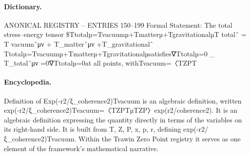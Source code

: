 \paragraph{Dictionary.}
ANONICAL REGISTRY – ENTRIES 150–199 Formal Statement: The total stress–energy tensor \$Ttotalµ=Tvacuumµ+Tmatterµ+TgravitationalµT totalˆ = T vacuumˆμν + T\_matterˆμν +T\_gravitationalˆ Ttotalµ=Tvacuumµ+Tmatterµ+Tgravitationalµsatisfies∇Ttotalµ=0 \_ T\_totalˆμν =0∇Ttotalµ=0at all points, withTvacuum=〈TZPT

\paragraph{Encyclopedia.}
Definition of Exp(-r2/ξ\_coherence2)Tvacuum is an algebraic definition, written exp(-r2/ξ\_coherence2)Tvacuum=〈TZPTµTZP〉exp(r2/coherence2). It is an algebraic definition expressing the quantity directly in terms of the variables on its right-hand side. It is built from T, Z, P, x, p, r, defining exp(-r2/ξ\_coherence2)Tvacuum. Within the Trawin Zero Point registry it serves as one element of the framework's mathematical narrative.
